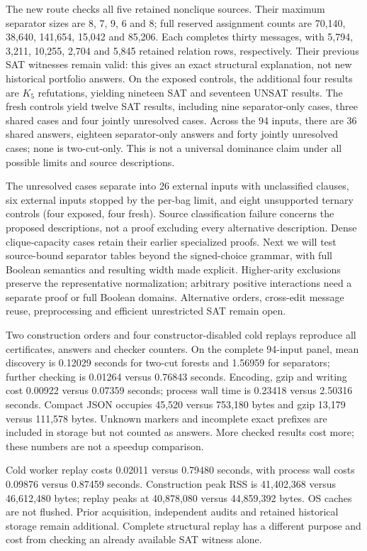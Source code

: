 The new route checks all five retained nonclique sources. Their maximum separator
sizes are 8, 7, 9, 6 and 8; full reserved assignment counts are 70,140,
38,640, 141,654, 15,042 and 85,206. Each completes thirty messages, with
5,794, 3,211, 10,255, 2,704 and 5,845 retained relation rows, respectively.
Their previous SAT witnesses remain valid: this gives an exact structural
explanation, not new historical portfolio answers. On the exposed controls,
the additional four results are $K_5$ refutations, yielding nineteen SAT and
seventeen UNSAT results. The fresh controls yield twelve SAT results, including
nine separator-only cases, three shared cases and four jointly unresolved cases.
Across the 94 inputs, there are 36 shared answers, eighteen separator-only answers
and forty jointly unresolved cases; none is two-cut-only. This is not a universal
dominance claim under all possible limits and source descriptions.

The unresolved cases separate into 26 external inputs with unclassified clauses,
six external inputs stopped by the per-bag limit, and eight unsupported ternary
controls (four exposed, four fresh). Source classification failure concerns the
proposed descriptions, not a proof excluding every alternative description.
Dense clique-capacity cases retain their earlier specialized proofs. Next we
will test source-bound separator tables beyond the signed-choice grammar, with
full Boolean semantics and resulting width made explicit. Higher-arity exclusions
preserve the representative normalization; arbitrary positive interactions need
a separate proof or full Boolean domains. Alternative orders, cross-edit message
reuse, preprocessing and efficient unrestricted SAT remain open.

Two construction orders and four constructor-disabled cold replays reproduce
all certificates, answers and checker counters. On the complete 94-input panel,
mean discovery is 0.12029 seconds for two-cut forests and 1.56959 for separators;
further checking is 0.01264 versus 0.76843 seconds. Encoding, gzip and writing
cost 0.00922 versus 0.07359 seconds; process wall time is 0.23418 versus
2.50316 seconds. Compact JSON occupies 45,520 versus 753,180 bytes and gzip
13,179 versus 111,578 bytes. Unknown markers and incomplete exact prefixes
are included in storage but not counted as answers. More checked results cost
more; these numbers are not a speedup comparison.

Cold worker replay costs 0.02011 versus 0.79480 seconds, with process wall
costs 0.09876 versus 0.87459 seconds. Construction peak RSS is 41,402,368
versus 46,612,480 bytes; replay peaks at 40,878,080 versus 44,859,392 bytes.
OS caches are not flushed. Prior acquisition, independent audits and retained
historical storage remain additional. Complete structural replay has a different
purpose and cost from checking an already available SAT witness alone.

